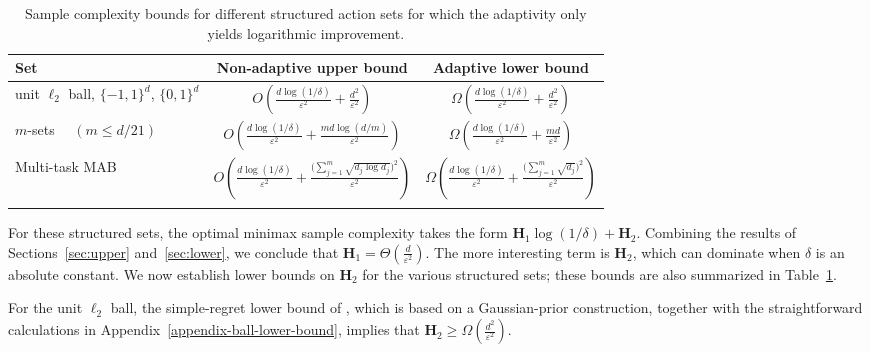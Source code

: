 \begin{table}[t]
\centering
\caption{Sample complexity bounds for different structured action sets for which the adaptivity only yields logarithmic improvement.}
\begin{tabular}{lcc}
\toprule
Set 
& Non-adaptive upper bound 
& Adaptive lower bound \\
\midrule
unit $\ell_2$ ball, $\{-1,1\}^d$, $\{0,1\}^d$
& $O\!\left(\frac{d\log(1/\delta)}{\varepsilon^2} + \frac{d^2}{\varepsilon^2}\right)$
& $\Omega\!\left(\frac{d\log(1/\delta)}{\varepsilon^2} + \frac{d^2}{\varepsilon^2}\right)$ \\

$m$-sets $\quad(m\leq d/21)$
& $O\!\left(\frac{d\log(1/\delta)}{\varepsilon^2} + \frac{md \log(d/m)}{\varepsilon^2}\right)$
& $\Omega\!\left(\frac{d\log(1/\delta)}{\varepsilon^2} + \frac{md}{\varepsilon^2}\right)$ \\

Multi-task MAB
& $O\!\left(\frac{d\log(1/\delta)}{\varepsilon^2} + \frac{\bigl(\sum_{j=1}^m \sqrt{d_j \log d_j}\bigr)^2}{\varepsilon^2}\right)$
& $\Omega\!\left(\frac{d\log(1/\delta)}{\varepsilon^2} + \frac{\bigl(\sum_{j=1}^m \sqrt{d_j}\bigr)^2}{\varepsilon^2}\right)$ \\
\bottomrule
\label{table:1}
\end{tabular}
\end{table}


For these structured sets, the optimal minimax sample complexity takes the form $\mathbf{H}_1\log(1/\delta)+\mathbf{H}_2$. Combining the results of Sections~\ref{sec:upper} and~\ref{sec:lower}, we conclude that $\mathbf{H}_1=\Theta\!\left(\frac{d}{\varepsilon^2}\right)$. The more interesting term is $\mathbf{H}_2$, which can dominate when $\delta$ is an absolute constant. We now establish lower bounds on $\mathbf{H}_2$ for the various structured sets; these bounds are also summarized in Table~\ref{table:1}.

For the unit $\ell_2$ ball, the simple-regret lower bound of \cite{chen2024assouad}, which is based on a Gaussian-prior construction, together with the straightforward calculations in Appendix~\ref{appendix-ball-lower-bound}, implies that $\mathbf{H}_2 \ge \Omega\!\left(\frac{d^2}{\varepsilon^2}\right)$.


